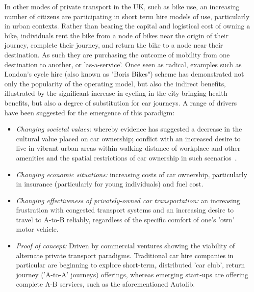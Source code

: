 \documentclass[journal]{IEEEtran}
\begin{document}
In other modes of private transport in the UK, such as bike use, an
increasing number of citizens are participating in short term hire
models of use, particularly in urban contexts. Rather than bearing the
capital and logistical cost of owning a bike, individuals rent the
bike from a node of bikes near the origin of their journey, complete
their journey, and return the bike to a node near their
destination. As such they are purchasing the outcome of mobility from
one destination to another, or 'as-a-service'. Once seen as radical,
examples such as London’s cycle hire (also known as "Boris Bikes")
scheme has demonstrated not only the popularity of the operating
model, but also the indirect benefits, illustrated by the significant
increase in cycling in the city bringing health benefits, but also a
degree of substitution for car journeys. A range of drivers have been
suggested for the emergence of this paradigm:

\begin{itemize}
\item {\emph{Changing societal values:}} whereby evidence has
suggested a decrease in the cultural value placed on car ownership;
conflict with an increased desire to live in vibrant urban areas
within walking distance of workplace and other amenities and the
spatial restrictions of car ownership in such
scenarios~\cite{jenks+burgess:2011}.
\item {\emph{Changing economic situations:}} increasing costs of car
ownership, particularly in insurance (particularly for young
individuals) and fuel cost.
\item {\emph{Changing effectiveness of privately-owned car
transportation:}} an increasing frustration with congested transport
systems and an increasing desire to travel to A-to-B reliably,
regardless of the specific comfort of one's 'own' motor vehicle.
\item {\emph{Proof of concept:}} Driven by commercial ventures
showing the viability of alternate private transport
paradigms. Traditional car hire companies in particular are beginning
to explore short-term, distributed 'car club', return journey
('A-to-A' journeys) offerings, whereas emerging start-ups are offering
complete A-B services, such as the aforementioned Autolib.
\end{itemize}

\end{document}

